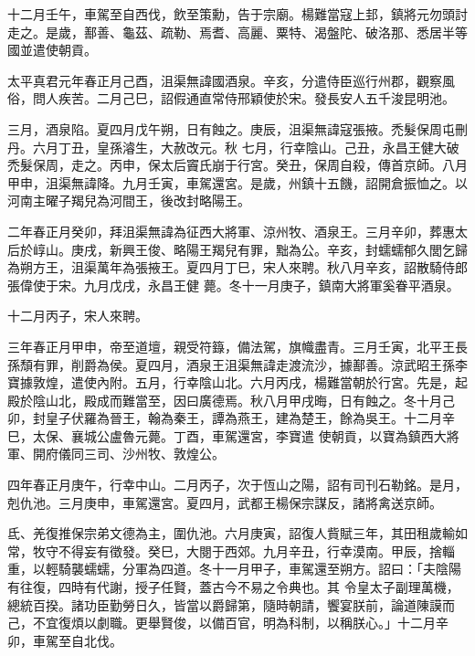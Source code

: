 \begin{pinyinscope}
 十二月壬午，車駕至自西伐，飲至策勳，告于宗廟。楊難當寇上邽，鎮將元勿頭討走之。是歲，鄯善、龜茲、疏勒、焉耆、高麗、粟特、渴盤陀、破洛那、悉居半等國並遣使朝貢。



 太平真君元年春正月己酉，沮渠無諱國酒泉。辛亥，分遣侍臣巡行州郡，觀察風俗，問人疾苦。二月己巳，詔假通直常侍邢穎使於宋。發長安人五千浚昆明池。



 三月，酒泉陷。夏四月戊午朔，日有蝕之。庚辰，沮渠無諱寇張掖。禿髮保周屯刪丹。六月丁丑，皇孫濬生，大赦改元。秋
 七月，行幸陰山。己丑，永昌王健大破禿髮保周，走之。丙申，保太后竇氏崩于行宮。癸丑，保周自殺，傳首京師。八月甲申，沮渠無諱降。九月壬寅，車駕還宮。是歲，州鎮十五饑，詔開倉振恤之。以河南主曜子羯兒為河間王，後改封略陽王。



 二年春正月癸卯，拜沮渠無諱為征西大將軍、涼州牧、酒泉王。三月辛卯，葬惠太后於崞山。庚戌，新興王俊、略陽王羯兒有罪，黜為公。辛亥，封蠕蠕郁久閭乞歸為朔方王，沮渠萬年為張掖王。夏四月丁巳，宋人來聘。秋八月辛亥，詔散騎侍郎張偉使于宋。九月戊戌，永昌王健
 薨。冬十一月庚子，鎮南大將軍奚眷平酒泉。



 十二月丙子，宋人來聘。



 三年春正月甲申，帝至道壇，親受符籙，備法駕，旗幟盡青。三月壬寅，北平王長孫頹有罪，削爵為侯。夏四月，酒泉王沮渠無諱走渡流沙，據鄯善。涼武昭王孫李寶據敦煌，遣使內附。五月，行幸陰山北。六月丙戌，楊難當朝於行宮。先是，起殿於陰山北，殿成而難當至，因曰廣德焉。秋八月甲戌晦，日有蝕之。冬十月己卯，封皇子伏羅為晉王，翰為秦王，譚為燕王，建為楚王，餘為吳王。十二月辛巳，太保、襄城公盧魯元薨。丁酉，車駕還宮，李寶遣
 使朝貢，以寶為鎮西大將軍、開府儀同三司、沙州牧、敦煌公。



 四年春正月庚午，行幸中山。二月丙子，次于恆山之陽，詔有司刊石勒銘。是月，剋仇池。三月庚申，車駕還宮。夏四月，武都王楊保宗謀反，諸將禽送京師。



 氐、羌復推保宗弟文德為主，圍仇池。六月庚寅，詔復人貲賦三年，其田租歲輸如常，牧守不得妄有徵發。癸巳，大閱于西郊。九月辛丑，行幸漠南。甲辰，捨輜重，以輕騎襲蠕蠕，分軍為四道。冬十一月甲子，車駕還至朔方。詔曰：「夫陰陽有往復，四時有代謝，授子任賢，蓋古今不易之令典也。其
 令皇太子副理萬機，總統百揆。諸功臣勤勞日久，皆當以爵歸第，隨時朝請，饗宴朕前，論道陳謨而己，不宜復煩以劇職。更舉賢俊，以備百官，明為科制，以稱朕心。」十二月辛卯，車駕至自北伐。




\end{pinyinscope}
